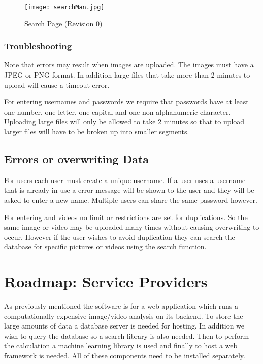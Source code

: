 \documentclass{scrreprt}
\begin{document}
\begin{figure}
  \texttt{[image: searchMan.jpg]}
  \caption{Search Page (Revision 0)}
  \label{fig:searchPage}
\end{figure}

\subsubsection{Troubleshooting}

Note that errors may result when images are uploaded.  The images must have a
JPEG or PNG format.  In addition large files that take more than 2 minutes to
upload will cause a timeout error.

For entering usernames and passwords we require that passwords have at least
one number, one letter, one capital and one non-alphanumeric character.
Uploading large files will only be allowed to take 2 minutes so that to upload
larger files will have to be broken up into smaller segments.


\subsection{Errors or overwriting Data}

For users each user must create a unique username.  If a user uses a username
that is already in use a error message will be shown to the user and they will
be asked to enter a new name.  Multiple users can share the same password
however.

For entering and videos no limit or restrictions are set for duplications.  So
the same image or video may be uploaded many times without causing overwriting
to occur.  However if the user wishes to avoid duplication they can search the
database for specific pictures or videos using the search function.


\section{Roadmap: Service Providers}

As previously mentioned the software is for a  web application which runs a
computationally expensive image/video analysis on its backend. To store the
large amounts of data a database server is needed for hosting.  In addition we
wish to query the database so a search library is also needed. Then to perform
the calculation a machine learning library is used and finally to host a web
framework is needed. All of these components need to be installed separately.
\end{document}
